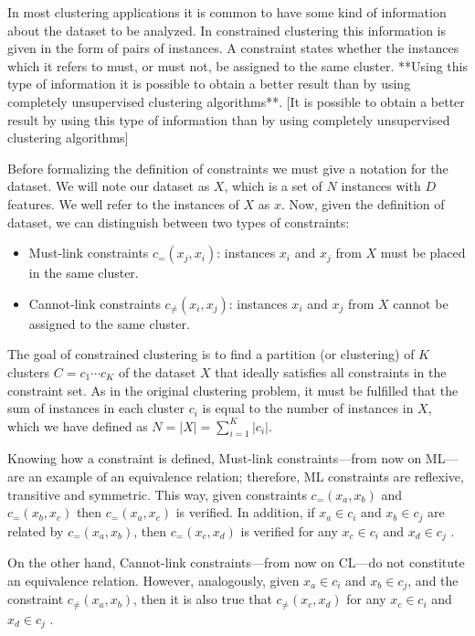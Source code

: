 \documentclass[review]{elsarticle}
\begin{document}
In most clustering applications it is common to have some kind of information about the dataset to be analyzed. In constrained clustering this information is given in the form of pairs of instances. A constraint states whether the instances which it refers to must, or must not, be assigned to the same cluster. **Using this type of information it is possible to obtain a better result than by using completely unsupervised clustering algorithms**. [It is possible to obtain a better result by using this type of information than by using completely unsupervised clustering algorithms]

Before formalizing the definition of constraints we must give a notation for the dataset. We will note our dataset as $X$, which is a set of $N$ instances with $D$ features. We well refer to the instances of $X$ as $x$. Now, given the definition of dataset, we can distinguish between two types of constraints:

\begin{itemize}

	\item Must-link constraints $c_=(x_j,x_i)$: instances $x_i$ and $x_j$ from $X$ must be placed in the same cluster.

	\item Cannot-link constraints $c_{\neq}(x_i,x_j)$: instances $x_i$ and $x_j$ from $X$ cannot be assigned to the same cluster.

\end{itemize}

The goal of constrained clustering is to find a partition (or clustering) of $K$ clusters $C = {c_1 \cdots c_K}$ of the dataset $X$ that ideally satisfies all constraints in the constraint set. As in the original clustering problem, it must be fulfilled that the sum of instances in each cluster $c_i$ is equal to the number of instances in $X$, which we have defined as $N = |X| = \sum_{i = 1}^{K} |c_i|$.

Knowing how a constraint is defined, Must-link constraints---from now on ML---are an example of an equivalence relation; therefore, ML constraints are reflexive, transitive and symmetric. This way, given constraints $c_=(x_a,x_b)$ and $c_=(x_b,x_c)$ then $c_=(x_a,x_c)$ is verified. In addition, if $x_a \in c_i$ and $x_b \in c_j$ are related by $c_=(x_a,x_b)$, then $c_=(x_c,x_d)$ is verified for any $x_c \in c_i$ and $x_d \in c_j$ \cite{xu2013improving}\cite{davidson2007survey}.

On the other hand, Cannot-link constraints---from now on CL---do not constitute an equivalence relation. However, analogously, given $x_a \in c_i$ and $x_b \in c_j$, and the constraint $c_{\neq}(x_a,x_b)$, then it is also true that $c_{\neq}(x_c,x_d)$ for any $x_c \in c_i$ and $x_d \in c_j$ \cite{davidson2007survey}.
\end{document}

